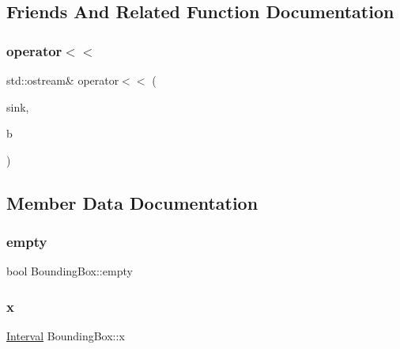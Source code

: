 \subsection{Friends And Related Function Documentation}
\mbox{\label{classBoundingBox_aa56e1d8e3d8c419be6c96f823f83648d}} 
\subsubsection{\texorpdfstring{operator$<$$<$}{operator<<}}
{\footnotesize\ttfamily std\+::ostream\& operator$<$$<$ (\begin{DoxyParamCaption}\item[{std\+::ostream \&}]{sink,  }\item[{const \mbox{\hyperlink{classBoundingBox}{Bounding\+Box}} \&}]{b }\end{DoxyParamCaption})\hspace{0.3cm}{\ttfamily [friend]}}



\subsection{Member Data Documentation}
\mbox{\label{classBoundingBox_a498e443b213cc08f7c0235688dd2ecf8}} 
\subsubsection{\texorpdfstring{empty}{empty}}
{\footnotesize\ttfamily bool Bounding\+Box\+::empty\hspace{0.3cm}{\ttfamily [private]}}

\mbox{\label{classBoundingBox_a93ea5f12ef2300fe61925f6b44faaebe}} 
\subsubsection{\texorpdfstring{x}{x}}
{\footnotesize\ttfamily \mbox{\hyperlink{classInterval}{Interval}} Bounding\+Box\+::x\hspace{0.3cm}{\ttfamily [private]}}

